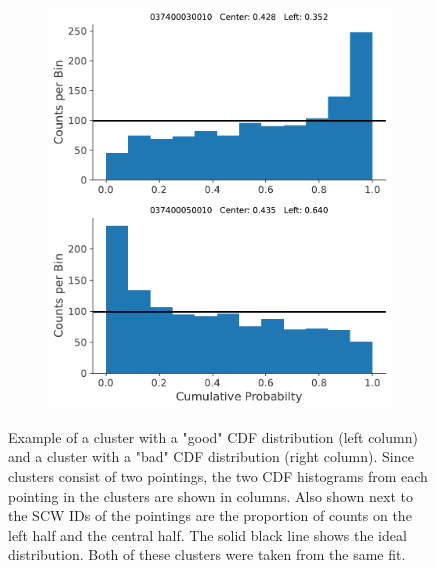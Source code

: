 \documentclass{report}
\begin{document}
\begin{figure}[h]
\begin{subfigure}{.5\textwidth}
    \includegraphics[width=.9\linewidth]{Images/PPC_and_Background_Analysis/037400030010_037400050010_cdf.pdf}
  \end{subfigure}
  \caption{Example of a cluster with a "good" CDF distribution (left column) and a cluster with a "bad" CDF distribution (right column).  Since clusters consist of two pointings, the two CDF histograms from each pointing in the clusters are shown in columns. Also shown next to the SCW IDs of the pointings are the proportion of counts on the left half and the central half. The solid black line shows the ideal distribution. Both of these clusters were taken from the same fit.}
  \label{fig ppc cdf ex good and bad}
  \end{figure}
\end{document}
